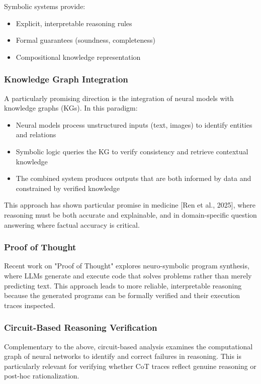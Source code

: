 \documentclass[11pt,a4paper]{article}
\begin{document}
Symbolic systems provide:
\begin{itemize}
  \item Explicit, interpretable reasoning rules
  \item Formal guarantees (soundness, completeness)
  \item Compositional knowledge representation
\end{itemize}

\subsubsection{Knowledge Graph Integration}

A particularly promising direction is the integration of neural models with knowledge graphs (KGs). In this paradigm:
\begin{itemize}
  \item Neural models process unstructured inputs (text, images) to identify entities and relations
  \item Symbolic logic queries the KG to verify consistency and retrieve contextual knowledge
  \item The combined system produces outputs that are both informed by data and constrained by verified knowledge
\end{itemize}

This approach has shown particular promise in medicine [Ren et al., 2025], where reasoning must be both accurate and explainable, and in domain-specific question answering where factual accuracy is critical.

\subsubsection{Proof of Thought}

Recent work on "Proof of Thought" explores neuro-symbolic program synthesis, where LLMs generate and execute code that solves problems rather than merely predicting text. This approach leads to more reliable, interpretable reasoning because the generated programs can be formally verified and their execution traces inspected.

\subsubsection{Circuit-Based Reasoning Verification}

Complementary to the above, circuit-based analysis examines the computational graph of neural networks to identify and correct failures in reasoning. This is particularly relevant for verifying whether CoT traces reflect genuine reasoning or post-hoc rationalization.
\end{document}
